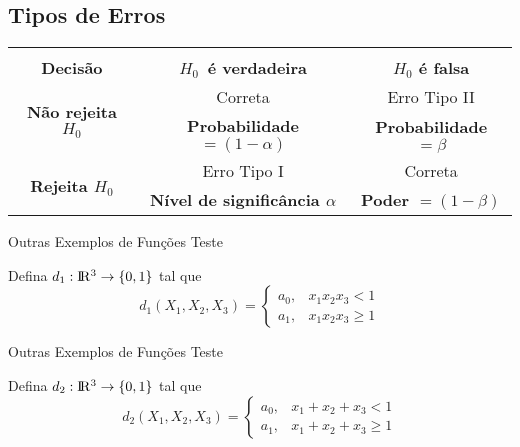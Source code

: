 \documentclass[12pt]{beamer}
\begin{document}
\subsection{Tipos de Erros}
\begin{frame}{}
\begin{block}{}
\begin{center}
\begin{table}[]
\begin{tabular}{c|c|c}
&&\\
                          \textbf{Decisão}                   &\textbf{$H_{0}\,$ é verdadeira}                         &\textbf{$H_{0}$ é falsa}\\ \hline
 \multirow{2}{*}{\textbf{Não rejeita $H_{0}$}}&Correta                                                               &Erro Tipo II\\
                                                                        &\textbf{Probabilidade $=\left(1-\alpha \right)$} &\textbf{Probabilidade $=\beta$}\\ \hline
\multirow{2}{*}{\textbf{Rejeita $H_{0}$}}       &Erro Tipo I                                                          &  Correta\\
                                                                        &\textbf{Nível de significância $\alpha$}            &\textbf{Poder $=\left( 1-\beta\right)$}\\ \hline
\end{tabular}
\end{table}
\end{center}
\end{block}
\end{frame}

\begin{frame}{Outras Exemplos de Funções Teste}
\begin{block}{}
\justifying
    Defina $d_{1}:\rm I\!R^{3}\rightarrow \{0,1\}$ tal que 
    \[
d_{1}(X_{1},X_{2},X_{3}) = 
  \begin{cases}
      a_{0}, & x_{1}x_{2}x_{3}<1 \\
      a_{1}, & x_{1}x_{2}x_{3} \geq 1 
  \end{cases}
\]
\end{block}
\end{frame}

\begin{frame}{Outras Exemplos de Funções Teste}
\begin{block}{}
\justifying
    Defina $d_{2}:\rm I\!R^{3}\rightarrow \{0,1\}$ tal que 
    \[
d_{2}(X_{1},X_{2},X_{3}) = 
  \begin{cases}
      a_{0}, & x_{1}+x_{2}+x_{3}<1 \\
      a_{1}, & x_{1}+x_{2}+x_{3} \geq 1 
  \end{cases}
\]
\end{block}
\end{frame}
\end{document}
